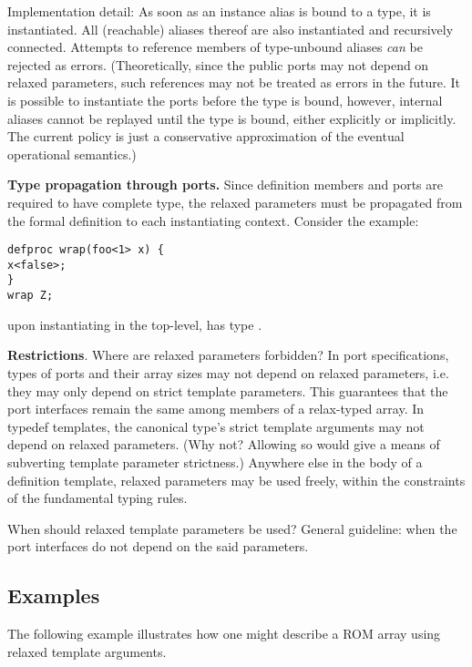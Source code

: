 Implementation detail: 
As soon as an instance alias is bound to a type, it is instantiated.  
All (reachable) aliases thereof are also instantiated and recursively
connected.  
Attempts to reference members of type-unbound aliases \emph{can} be
rejected as errors.  
(Theoretically, since the public ports may not depend on relaxed
parameters, such references may not be treated as errors in the future.
It is possible to instantiate the ports before the type is bound, 
however, internal aliases cannot be replayed until the type is bound, 
either explicitly or implicitly.
The current policy is just a conservative approximation of the eventual
operational semantics.)

\textbf{Type propagation through ports.}
Since definition members and ports are required to have complete type, 
the relaxed parameters must be propagated from the formal definition
to each instantiating context.  Consider the example:
\begin{verbatim}
defproc wrap(foo<1> x) {
x<false>;
}
wrap Z;
\end{verbatim}
\noindent
upon instantiating  in the top-level,
 has type .  

\textbf{Restrictions}.
Where are relaxed parameters forbidden?
In port specifications, types of ports and their array sizes
may not depend on relaxed parameters, 
i.e. they may only depend on strict template parameters.  
This guarantees that the port interfaces remain the same among
members of a relax-typed array.  
In typedef templates, the canonical type's strict template arguments
may not depend on relaxed parameters.  
(Why not?  Allowing so would give a means of subverting 
template parameter strictness.)
Anywhere else in the body of a definition template, 
relaxed parameters may be used freely, 
within the constraints of the fundamental typing rules.  

\medskip
When should relaxed template parameters be used?
General guideline: when the port interfaces do not depend on
the said parameters.  

\subsection{Examples}
\label{sec:templates:equivalence:examples}

The following example illustrates how one might describe a ROM array
using relaxed template arguments.

